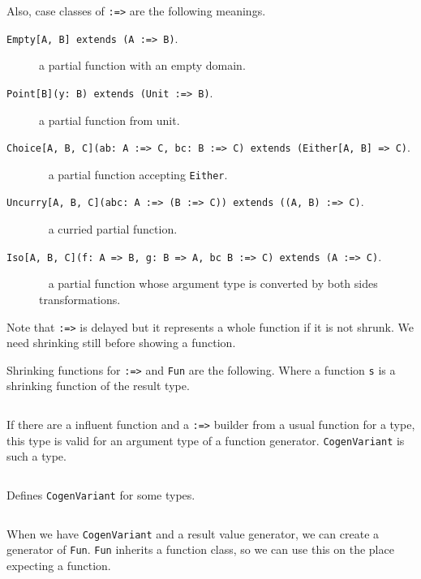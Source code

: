 \documentclass[a4paper,10pt]{article}
\theoremstyle{definition}
\begin{document}
Also, case classes of \texttt{:=>} are the following meanings.

\begin{description}
  \item[\texttt{Empty[A, B] extends (A :=> B)}.] a partial function with an empty domain.
  \item[\texttt{Point[B](y: B) extends (Unit :=> B)}.] a partial function from unit.
  \item[\texttt{Choice[A, B, C](ab: A :=> C, bc: B :=> C) extends (Either[A, B] => C)}.] ~\newline
    \hspace{2em} a partial function accepting \texttt{Either}.
  \item[\texttt{Uncurry[A, B, C](abc: A :=> (B :=> C)) extends ((A, B) :=> C)}.] ~\newline
    \hspace{2em} a curried partial function.
  \item[\texttt{Iso[A, B, C](f: A => B, g: B => A, bc B :=> C) extends (A :=> C)}.] ~\newline
    \hspace{2em} a partial function whose argument type is converted by both sides transformations.
\end{description}

Note that \texttt{:=>} is delayed but it represents a whole function if it is not shrunk.
We need shrinking still before showing a function.

Shrinking functions for \texttt{:=>} and \texttt{Fun} are the following.
Where a function \texttt{s} is a shrinking function of the result type.

\inputminted[breaklines,firstline=110,lastline=119]{scala}{../src/main/scala/minicheck.scala}

If there are a influent function and a \texttt{:=>} builder from a usual function for a type, this type is valid for an argument type of a function generator.
\texttt{CogenVariant} is such a type.

\inputminted[breaklines,firstline=121,lastline=123]{scala}{../src/main/scala/minicheck.scala}

Defines \texttt{CogenVariant} for some types.

\inputminted[breaklines,firstline=125,lastline=141]{scala}{../src/main/scala/minicheck.scala}

When we have \texttt{CogenVariant} and a result value generator, we can create a generator of \texttt{Fun}.
\texttt{Fun} inherits a function class, so we can use this on the place expecting a function.
\end{document}
